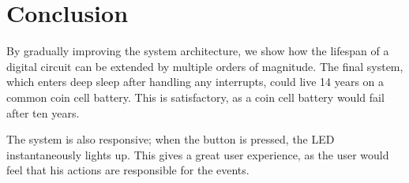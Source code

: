 \section{Conclusion}
By gradually improving the system architecture, we show how the lifespan of a digital circuit can be extended by multiple orders of magnitude.
The final system, which enters deep sleep after handling any interrupts, could live 14 years on a common coin cell battery.
This is satisfactory, as a coin cell battery would fail after ten years.

The system is also responsive; when the button is pressed, the LED instantaneously lights up.
This gives a great user experience, as the user would feel that his actions are responsible for the events.
